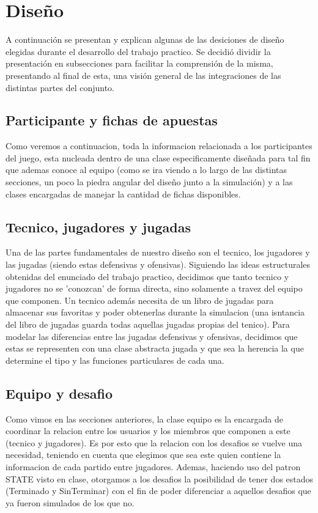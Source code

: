 \section{Diseño}
A continuación se presentan y explican algunas de las desiciones de diseño elegidas durante el desarrollo del trabajo practico.
Se decidió dividir la presentación en subsecciones para facilitar la comprensión de la misma, presentando al final de esta, una visión general de las integraciones de las distintas partes del conjunto.

\subsection{Participante y fichas de apuestas}
Como veremos a continuacion, toda la informacion relacionada a los participantes del juego, esta nucleada dentro de una clase especificamente diseñada para tal fin que ademas conoce al equipo (como se ira viendo a lo largo de las distintas secciones, un poco la piedra angular del diseño junto a la simulación) y a las clases encargadas de manejar la cantidad de fichas disponibles.


\subsection{Tecnico, jugadores y jugadas}
Una de las partes fundamentales de nuestro diseño son el tecnico, los jugadores y las jugadas (siendo estas defensivas y ofensivas).
Siguiendo las ideas estructurales obtenidas del enunciado del trabajo practico, decidimos que tanto tecnico y jugadores no se 'conozcan' de forma directa, sino solamente a travez del equipo que componen. Un tecnico además necesita de un libro de jugadas para almacenar sus favoritas y poder obtenerlas durante la simulacion (una isntancia del libro de jugadas guarda todas aquellas jugadas propias del tenico). Para modelar las diferencias entre las jugadas defensivas y ofensivas, decidimos que estas se representen con una clase abstracta jugada y que sea la herencia la que determine el tipo y las funciones particulares de cada una.


\subsection{Equipo y desafio}
Como vimos en las secciones anteriores, la clase equipo es la encargada de coordinar la relacion entre los usuarios y los miembros que componen a este (tecnico y jugadores). Es por esto que la relacion con los desafios se vuelve una necesidad, teniendo en cuenta que elegimos que sea este quien contiene la informacion de cada partido entre jugadores. Ademas, haciendo uso del patron STATE visto en clase, otorgamos a los desafios la posibilidad de tener dos estados (Terminado y SinTerminar) con el fin de poder diferenciar a aquellos desafios que ya fueron simulados de los que no.

